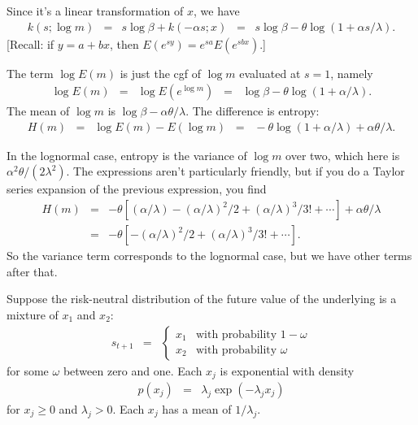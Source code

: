 \documentclass[11pt]{exam}
\begin{document}
\begin{questions}
\begin{solution}
\begin{parts}
\item Since it's a linear transformation of $x$, we have
\begin{eqnarray*}
    k(s; \log m) &=& s \log \beta + k(-\alpha s; x)
        \;\;=\;\; s \log \beta - \theta \log (1 + \alpha s/\lambda) .
\end{eqnarray*}
[Recall: if $y = a + bx$, then
$E(e^{sy}) = e^{sa} E(e^{sbx}) $.]

\item The term $ \log E(m) $ is just the cgf of $\log m$
evaluated at $s = 1$, namely
\begin{eqnarray*}
    \log E(m) &=& \log E (e^{\log m})
            \;\;=\;\; \log \beta - \theta \log (1+\alpha/\lambda) .
\end{eqnarray*}
The mean of $\log m$ is $ \log \beta - \alpha \theta/\lambda $.
The difference is entropy:
\begin{eqnarray*}
    H(m) &=& \log E (m) - E (\log m)
            \;\;=\;\; - \theta \log (1+\alpha/\lambda) + \alpha \theta/\lambda.
\end{eqnarray*}

\item In the lognormal case, entropy is the variance of $\log m$ over two,
which here is $ \alpha^2 \theta /(2 \lambda^2)$.
The expressions aren't particularly friendly,
but if you do a Taylor series expansion of the previous
expression, you find
\begin{eqnarray*}
    H(m) &=& - \theta \left[ (\alpha/\lambda) - (\alpha/\lambda)^2/2
        + (\alpha/\lambda)^3/3! + \cdots \right]
        + \alpha \theta/\lambda \\
        &=& - \theta \left[ - (\alpha/\lambda)^2/2
        + (\alpha/\lambda)^3/3! + \cdots \right] .
\end{eqnarray*}
So the variance term corresponds to the lognormal case,
but we have other terms after that.
\end{parts}
\end{solution}

Suppose the risk-neutral distribution of the future value of the underlying
is a mixture of $x_1$ and $x_2$:
\begin{eqnarray*}
    s_{t+1} &=&
        \left\{
        \begin{array}{ll}
            x_1 & \mbox{with probability } 1-\omega \\
            x_2 & \mbox{with probability } \omega
        \end{array}
        \right.
\end{eqnarray*}
for some $\omega$ between zero and one.
Each $x_j$ is exponential with density
\begin{eqnarray*}
    p(x_j) &=& \lambda_j \exp(-\lambda_j x_j)
\end{eqnarray*}
for $x_j \geq 0$ and $\lambda_j > 0$.
Each $x_j$ has a mean of $1/\lambda_j$.


\end{questions}
\end{document}
